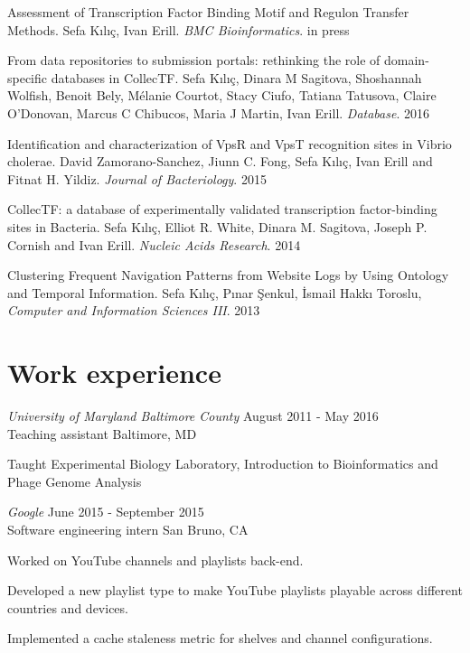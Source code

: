 {\begin{myenumerate}
\item Assessment of Transcription Factor Binding Motif and Regulon Transfer
  Methods. Sefa Kılıç, Ivan Erill. \textit{BMC Bioinformatics}. in press

\item From data repositories to submission portals: rethinking the role of
  domain-specific databases in CollecTF. Sefa Kılıç, Dinara M Sagitova,
  Shoshannah Wolfish, Benoit Bely, Mélanie Courtot, Stacy Ciufo, Tatiana
  Tatusova, Claire O’Donovan, Marcus C Chibucos, Maria J Martin, Ivan
  Erill. \textit{Database}. 2016

\item Identification and characterization of VpsR and VpsT recognition sites in
  Vibrio cholerae. David Zamorano-Sanchez, Jiunn C. Fong, Sefa Kılıç, Ivan
  Erill and Fitnat H. Yildiz. \textit{Journal of Bacteriology}. 2015

\item CollecTF: a database of experimentally validated transcription
  factor-binding sites in Bacteria. Sefa Kılıç, Elliot R. White, Dinara
  M. Sagitova, Joseph P. Cornish and Ivan Erill. \textit{Nucleic Acids
  Research}. 2014

\item Clustering Frequent Navigation Patterns from Website Logs by Using
  Ontology and Temporal Information. Sefa Kılıç, Pınar Şenkul, İsmail Hakkı
  Toroslu, \textit{Computer and Information Sciences III}. 2013

\end{myenumerate}


\section*{\textbf{Work experience}}

\textit{University of Maryland Baltimore County} \hfill{August 2011 - May 2016}\\
Teaching assistant \hfill{Baltimore, MD}
\begin{myitemize}
\item Taught Experimental Biology Laboratory, Introduction to Bioinformatics
  and Phage Genome Analysis
\end{myitemize}

\textit{Google} \hfill{June 2015 - September 2015}\\
Software engineering intern \hfill{San Bruno, CA}
\begin{myitemize}
\item Worked on YouTube channels and playlists back-end.
\item Developed a new playlist type to make YouTube playlists playable across different countries and devices.
\item Implemented a cache staleness metric for shelves and channel configurations.
\end{myitemize}

}
